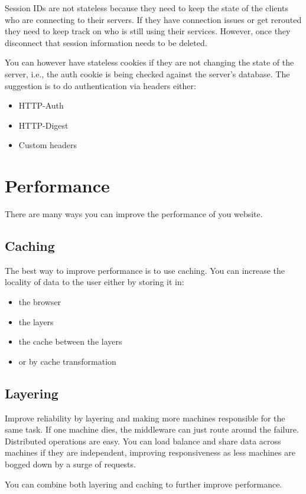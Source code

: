 \documentclass[../CMPUT-404-Notes.tex]{subfiles}
\begin{document}
Session IDs are not stateless because they need to keep the state of the clients who are connecting to their servers. If they have connection issues or get rerouted they need to keep track on who is still using their services. However, once they disconnect that session information needs to be deleted.

You can however have stateless cookies if they are not changing the state of the server, i.e., the auth cookie is being checked against the server's database.
The suggestion is to do authentication via headers either:
\begin{itemize}
  \item HTTP-Auth
  \item HTTP-Digest
  \item Custom headers
\end{itemize}

\section{Performance}
There are many ways you can improve the performance of you website.

\subsection{Caching}
The best way to improve performance is to use caching.
You can increase the locality of data to the user either by storing it in:
\begin{itemize}
  \item the browser
  \item the layers
  \item the cache between the layers
  \item or by cache transformation
\end{itemize}

\subsection{Layering}
Improve reliability by layering and making more machines responsible for the same task.
If one machine dies, the middleware can just route around the failure. Distributed operations are easy.
You can load balance and share data across machines if they are independent, improving responsiveness as less machines are bogged down by a surge of requests.

You can combine both layering and caching to further improve performance.
\end{document}
